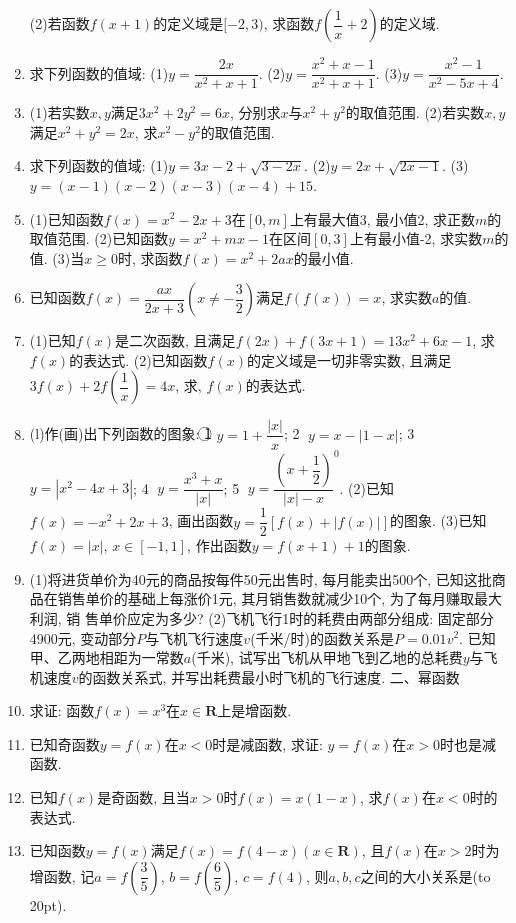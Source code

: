 \documentclass[10pt,a4paper]{article}
\newcommand{\bracket}[1]{(\hbox to #1pt{})}
\begin{document}
\begin{enumerate}[1.]
       (2)若函数$f(x+1)$的定义域是$[ -2,3)$, 求函数$f(\dfrac 1x+2)$的定义域.
    \item 求下列函数的值域:
    (1)$y=\dfrac{2x}{{x^2}+x+1}$.			(2)$y=\dfrac{{x^2}+x-1}{{x^2}+x+1}$.		(3)$y=\dfrac{{x^2}-1}{{x^2}-5x+4}$.
    \item (1)若实数$x,y$满足$3x^2+2y^2=6x$, 分别求$x$与$x^2+y^2$的取值范围.
        (2)若实数$x,y$满足$x^2+y^2=2x$, 求$x^2-y^2$的取值范围.
    \item 求下列函数的值域:
    (1)$y=3x-2+\sqrt{3-2x}$.
    (2)$y=2x+\sqrt{2x-1}$.
    (3)$y=(x-1)(x-2)(x-3)(x-4)+15$.
    \item (1)已知函数$f(x)=x^2-2x+3$在$[ 0,m ]$上有最大值3, 最小值2, 求正数$m$的取值范围.
        (2)已知函数$y=x^2+mx-1$在区间$[ 0,3 ]$上有最小值-2, 求实数$m$的值.
        (3)当$x\ge 0$时, 求函数$f(x)=x^2+2ax$的最小值.
    \item 已知函数$f(x)=\dfrac{ax}{2x+3}(x\ne -\dfrac 32)$满足$f(f(x))=x$, 求实数$a$的值.
    \item (1)已知$f(x)$是二次函数, 且满足$f(2x)+f(3x+1)=13x^2+6x-1$, 求$f(x)$的表达式.
        (2)已知函数$f(x)$的定义域是一切非零实数, 且满足$3f(x)+2f(\dfrac 1x)=4x$, 求, $f(x)$的表达式.
    \item (l)作(画)出下列函数的图象:
    \textcircled{1} $y=1+\dfrac{|x|}x$; \textcircled{2} $y=x-|1-x|$; \textcircled{3} $y=|x^2-4x+3|$; \textcircled{4} $y=\dfrac{{x^3}+x}{|x|}$; \textcircled{5} $y={{\dfrac{(x+\dfrac 12)}{|x|-x}}^0}$.
    (2)已知$f(x)=-x^2+2x+3$, 画出函数$y=\dfrac 12[ f(x)+|f(x)|]$的图象.
    (3)已知$f(x)=|x|$, $x\in [ -1,1 ]$, 作出函数$y=f(x+1)+1$的图象.
    \item (1)将进货单价为40元的商品按每件50元出售时, 每月能卖出500个, 已知这批商品在销售单价的基础上每涨价1元, 其月销售数就减少10个, 为了每月赚取最大利润, 销
    售单价应定为多少?
    (2)飞机飞行1时的耗费由两部分组成: 固定部分4900元, 变动部分$P$与飞机飞行速度$v$(千米/时)的函数关系是$P=0.01v^2$. 已知甲、乙两地相距为一常数$a$(千米), 试写出飞机从甲地飞到乙地的总耗费$y$与飞机速度$v$的函数关系式, 并写出耗费最小时飞机的飞行速度.
    二、幂函数
    \item 求证: 函数$f(x)=x^3$在$x\in \mathbf{R}$上是增函数.
    \item 已知奇函数$y=f(x)$在$x<0$时是减函数, 求证: $y=f(x)$在$x>0$时也是减函数.
    \item 已知$f(x)$是奇函数, 且当$x>0$时$f(x)=x(1-x)$, 求$f(x)$在$x<0$时的表达式.
    \item 已知函数$y=f(x)$满足$f(x)=f(4-x)(x\in \mathbf{R})$, 且$f(x)$在$x>2$时为增函数, 记$a=f(\dfrac 35)$, $b=f(\dfrac 65)$, $c=f(4)$, 则$a,b,c$之间的大小关系是\bracket{20}.

\end{enumerate}
\end{document}
